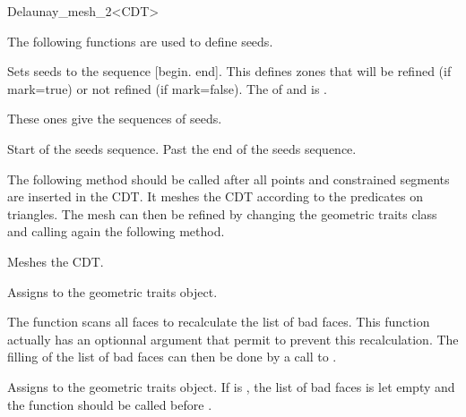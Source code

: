 \begin{ccRefClass}{Delaunay_mesh_2<CDT>}


The following functions are used to define seeds.


{ Sets seeds to the sequence [begin. end]. This defines zones that
  will be refined (if mark=true) or not refined (if
  mark=false).
  \ccPrecond The  of  and 
  is .}

These ones give the sequences of seeds.

{ Start of the seeds sequence. }
\ccGlue
{}
{ Past the end of the seeds sequence. }


The following method should be called after all points and constrained 
segments are inserted in the CDT. It meshes the CDT according to the
 predicates on triangles.  The mesh can then be refined by
changing the geometric traits class and calling again the following
method.

{ Meshes the CDT. }

{ Assigns  to the geometric traits object. }

\begin{ccAdvanced}
  The function  scans all faces to recalculate the
  list of bad faces. This function actually has an optionnal argument that
  permit to prevent this recalculation. The filling of the list of bad
  faces can then be done by a call to .
  
  { Assigns  to the geometric traits object. If
     is , the list of bad faces is
    let empty and the function  should be called before
    .}


\end{ccAdvanced}
\end{ccRefClass}
